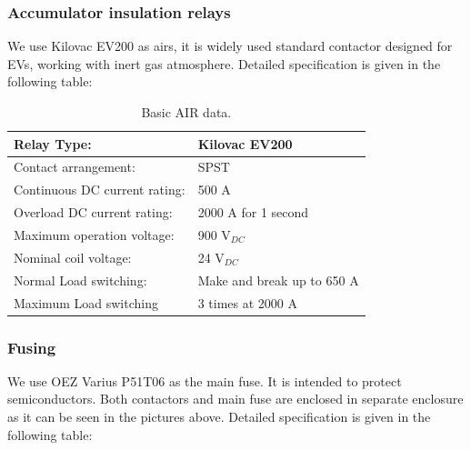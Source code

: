\subsubsection{Accumulator insulation relays}\label{subsec:airs}

We use Kilovac EV200 as \glspl{air}, it is widely used standard contactor designed for EVs, working with inert gas atmosphere. Detailed specification is given in the following table:

\begin{table}[H]
	\centering
	\caption{Basic AIR data.}
	\begin{tabularx}{\textwidth}{|X|X|}
		\hline
		Relay Type: & Kilovac EV200 \\[\TableSize]
		\hline
		Contact arrangement: & SPST \\[\TableSize]
		\hline
		Continuous DC current rating: & 500 A \\[\TableSize]
		\hline
		Overload DC current rating:  & 2000 A for 1 second \\[\TableSize]
		\hline
		Maximum operation voltage: & 900 V$_{DC}$ \\[\TableSize]
		\hline
		Nominal coil voltage: & 24 V$_{DC}$ \\[\TableSize]
		\hline
		Normal Load switching: & Make and break up to 650 A \\[\TableSize]
		\hline
		Maximum Load switching & 3 times at 2000 A \\[\TableSize]
		\hline
	\end{tabularx}%
	\label{tab:acc-air}%
\end{table}%

\subsubsection{Fusing}

We use OEZ Varius P51T06 as the main fuse. It is intended to protect semiconductors. Both contactors and main fuse are enclosed in separate enclosure as it can be seen in the pictures above. Detailed specification is given in the following table:

